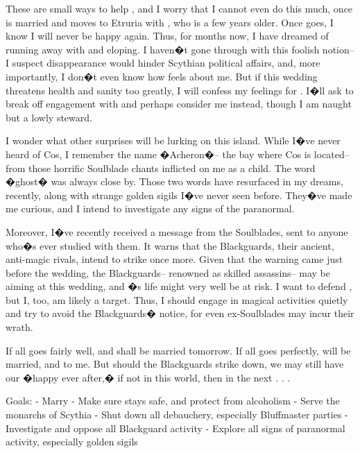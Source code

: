 \documentclass[char]{Kos}
\begin{document}
These are small ways to help \cBride{\nickname}, and I worry that I cannot even do this much, once \cBride{\they} is married and moves to Etruria with \cGroom{\nickname}, who is a few years older. Once \cBride{\they} goes, I know I will never be happy again. Thus, for months now, I have dreamed of running away with \cBride{\nickname} and eloping. I haven�t gone through with this foolish notion-- I suspect \cBride{\their} disappearance would hinder Scythian political affairs, and, more importantly, I don�t even know how \cBride{\nickname} feels about me. But if this wedding threatens \cBride{\their} health and sanity too greatly, I will confess my feelings for \cBride{\them}. I�ll ask \cBride{\them} to break off \cBride{\their} engagement with \cGroom{\nickname} and perhaps consider me instead, though I am naught but a lowly steward. 

I wonder what other surprises will be lurking on this island. While I�ve never heard of Cos, I remember the name �Acheron�-- the bay where Cos is located-- from those horrific Soulblade chants inflicted on me as a child. The word �ghost� was always close by. Those two words have resurfaced in my dreams, recently, along with strange golden sigils I�ve never seen before. They�ve made me curious, and I intend to investigate any signs of the paranormal.

Moreover, I�ve recently received a message from the Soulblades, sent to anyone who�s ever studied with them. It warns that the Blackguards, their ancient, anti-magic rivals, intend to strike once more. Given that the warning came just before the wedding, the Blackguards-- renowned as skilled assassins-- may be aiming at this wedding, and \cBride{\nickname}�s life might very well be at risk. I want to defend \cBride{\them}, but I, too, am likely a target. Thus, I should engage in magical activities quietly and try to avoid the Blackguards� notice, for even ex-Soulblades may incur their wrath.

If all goes fairly well, \cBride{\nickname} and \cGroom{\nickname} shall be married tomorrow. If all goes perfectly, \cBride{\nickname} will be married, and to me. But should the Blackguards strike \cBride{\them} down, we may still have our �happy ever after,� if not in this world, then in the next . . .

Goals:
- Marry \cBride{\nickname}
- Make sure \cBride{\nickname} stays safe, and protect \cBride{\them} from alcoholism
- Serve the monarchs of Scythia
- Shut down all debauchery, especially Bluffmaster parties
- Investigate and oppose all Blackguard activity
- Explore all signs of paranormal activity, especially golden sigils
\end{document}
